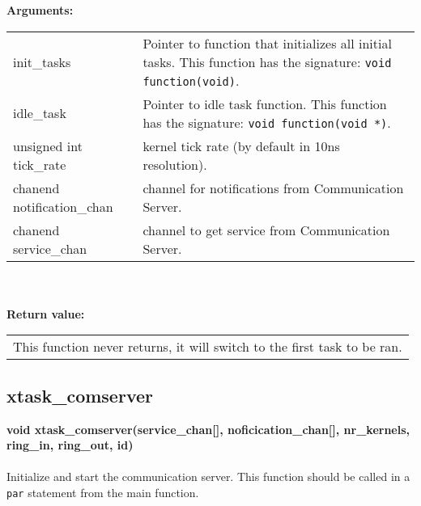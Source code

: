 \noindent
\textbf{Arguments:}\\
\indent\begin{tabular}{ p{4.5cm}  p{9cm} }
init\_tasks & Pointer to function that initializes all initial tasks.
              This function has the signature: \verb|void function(void)|. \\
idle\_task  & Pointer to idle task function.
              This function has the signature: \verb|void function(void *)|.\\
unsigned int
tick\_rate  & kernel tick rate (by default in 10ns resolution).\\
chanend
notification\_chan & channel for notifications from Communication Server.\\
chanend
service\_chan      & channel to get service from Communication Server.
\end{tabular}\\\\

\noindent
\textbf{Return value:}\\
\indent\begin{tabular}{  p{13.5cm} }
This function never returns, it will switch to the first task to be ran.
\end{tabular}

\subsection{xtask\_comserver}
\noindent
\textbf{void xtask\_comserver(service\_chan[], noficication\_chan[], nr\_kernels, 
        ring\_in, ring\_out, id)}\\\\
Initialize and start the communication server.
This function should be called in a \verb|par| statement from the main function.\\


